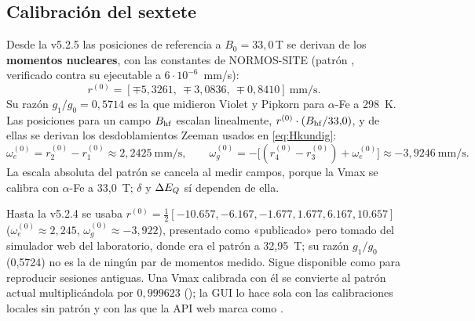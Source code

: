 \subsection{Calibración del sextete}\label{ap:calib}
Desde la v5.2.5 las posiciones de referencia a $B_0=33{,}0\,$T se derivan de los
\textbf{momentos nucleares}, con las constantes de NORMOS-SITE (patrón
, verificado contra su ejecutable a $6\cdot10^{-6}$~mm/s):
\begin{equation}
  r^{(0)} = [\mp5{,}3261,\ \mp3{,}0836,\ \mp0{,}8410]\ \text{mm/s}.
\end{equation}
Su razón $g_1/g_0=0{,}5714$ es la que midieron Violet y Pipkorn para $\alpha$-Fe a
298~K. Las posiciones para un campo $B_{\mathrm{hf}}$ escalan linealmente,
$r^{(0)}\cdot(B_{\mathrm{hf}}/33{,}0)$, y de ellas se derivan los desdoblamientos Zeeman usados
en \eqref{eq:Hkundig}:
\begin{equation}
  \omega_e^{(0)} = r^{(0)}_2-r^{(0)}_1 \approx 2{,}2425\ \text{mm/s},\qquad
  \omega_g^{(0)} = -\bigl[(r^{(0)}_4-r^{(0)}_3)+\omega_e^{(0)}\bigr] \approx -3{,}9246\ \text{mm/s}.
\end{equation}
La escala absoluta del patrón se cancela al medir campos, porque la Vmax se calibra
con $\alpha$-Fe a 33{,}0~T; $\delta$ y $\Delta E_{Q}$ sí dependen de ella.
\begin{nota}
Hasta la v5.2.4 se usaba $r^{(0)}=\tfrac12[-10.657,-6.167,-1.677,1.677,6.167,10.657]$
($\omega_e^{(0)}\approx2{,}245$, $\omega_g^{(0)}\approx-3{,}922$), presentado como
«publicado» pero tomado del simulador web del laboratorio, donde era el patrón a
32{,}95~T; su razón $g_1/g_0$ (0{,}5724) no es la de ningún par de momentos medido.
Sigue disponible como  para reproducir sesiones antiguas. Una Vmax
calibrada con él se convierte al patrón actual multiplicándola por $0{,}999623$
(); la GUI lo hace sola con las calibraciones
locales sin patrón y con las que la API web marca como .
\end{nota}

